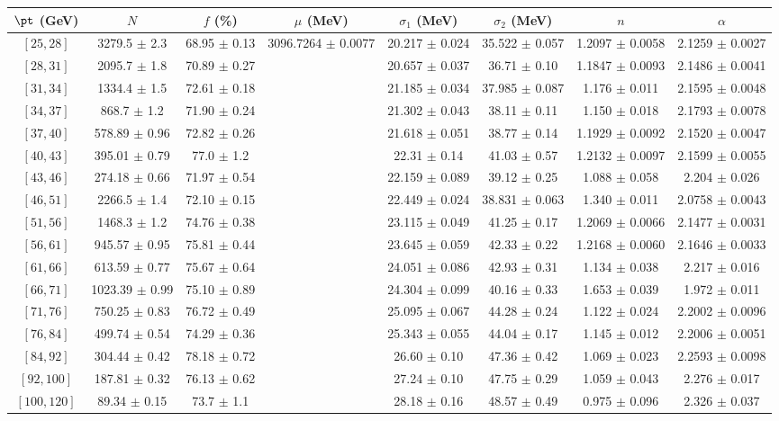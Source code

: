 \begin{tabular}{c||c|c|c|c|c|c|c}
$\pt$ (GeV) & $N$ & $f$ (\%) & $\mu$ (MeV) & $\sigma_1$ (MeV) & $\sigma_2$ (MeV) & $n$ & $\alpha$ \\
\hline
$[25, 28]$ & 3279.5 $\pm$ 2.3 & 68.95 $\pm$ 0.13 & \multirow{17}{*}{3096.7264 $\pm$ 0.0077} & 20.217 $\pm$ 0.024 & 35.522 $\pm$ 0.057 & 1.2097 $\pm$ 0.0058 & 2.1259 $\pm$ 0.0027\\
$[28, 31]$ & 2095.7 $\pm$ 1.8 & 70.89 $\pm$ 0.27 &  & 20.657 $\pm$ 0.037 & 36.71 $\pm$ 0.10 & 1.1847 $\pm$ 0.0093 & 2.1486 $\pm$ 0.0041\\
$[31, 34]$ & 1334.4 $\pm$ 1.5 & 72.61 $\pm$ 0.18 &  & 21.185 $\pm$ 0.034 & 37.985 $\pm$ 0.087 & 1.176 $\pm$ 0.011 & 2.1595 $\pm$ 0.0048\\
$[34, 37]$ & 868.7 $\pm$ 1.2 & 71.90 $\pm$ 0.24 &  & 21.302 $\pm$ 0.043 & 38.11 $\pm$ 0.11 & 1.150 $\pm$ 0.018 & 2.1793 $\pm$ 0.0078\\
$[37, 40]$ & 578.89 $\pm$ 0.96 & 72.82 $\pm$ 0.26 &  & 21.618 $\pm$ 0.051 & 38.77 $\pm$ 0.14 & 1.1929 $\pm$ 0.0092 & 2.1520 $\pm$ 0.0047\\
$[40, 43]$ & 395.01 $\pm$ 0.79 & 77.0 $\pm$ 1.2 &  & 22.31 $\pm$ 0.14 & 41.03 $\pm$ 0.57 & 1.2132 $\pm$ 0.0097 & 2.1599 $\pm$ 0.0055\\
$[43, 46]$ & 274.18 $\pm$ 0.66 & 71.97 $\pm$ 0.54 &  & 22.159 $\pm$ 0.089 & 39.12 $\pm$ 0.25 & 1.088 $\pm$ 0.058 & 2.204 $\pm$ 0.026\\
$[46, 51]$ & 2266.5 $\pm$ 1.4 & 72.10 $\pm$ 0.15 &  & 22.449 $\pm$ 0.024 & 38.831 $\pm$ 0.063 & 1.340 $\pm$ 0.011 & 2.0758 $\pm$ 0.0043\\
$[51, 56]$ & 1468.3 $\pm$ 1.2 & 74.76 $\pm$ 0.38 &  & 23.115 $\pm$ 0.049 & 41.25 $\pm$ 0.17 & 1.2069 $\pm$ 0.0066 & 2.1477 $\pm$ 0.0031\\
$[56, 61]$ & 945.57 $\pm$ 0.95 & 75.81 $\pm$ 0.44 &  & 23.645 $\pm$ 0.059 & 42.33 $\pm$ 0.22 & 1.2168 $\pm$ 0.0060 & 2.1646 $\pm$ 0.0033\\
$[61, 66]$ & 613.59 $\pm$ 0.77 & 75.67 $\pm$ 0.64 &  & 24.051 $\pm$ 0.086 & 42.93 $\pm$ 0.31 & 1.134 $\pm$ 0.038 & 2.217 $\pm$ 0.016\\
$[66, 71]$ & 1023.39 $\pm$ 0.99 & 75.10 $\pm$ 0.89 &  & 24.304 $\pm$ 0.099 & 40.16 $\pm$ 0.33 & 1.653 $\pm$ 0.039 & 1.972 $\pm$ 0.011\\
$[71, 76]$ & 750.25 $\pm$ 0.83 & 76.72 $\pm$ 0.49 &  & 25.095 $\pm$ 0.067 & 44.28 $\pm$ 0.24 & 1.122 $\pm$ 0.024 & 2.2002 $\pm$ 0.0096\\
$[76, 84]$ & 499.74 $\pm$ 0.54 & 74.29 $\pm$ 0.36 &  & 25.343 $\pm$ 0.055 & 44.04 $\pm$ 0.17 & 1.145 $\pm$ 0.012 & 2.2006 $\pm$ 0.0051\\
$[84, 92]$ & 304.44 $\pm$ 0.42 & 78.18 $\pm$ 0.72 &  & 26.60 $\pm$ 0.10 & 47.36 $\pm$ 0.42 & 1.069 $\pm$ 0.023 & 2.2593 $\pm$ 0.0098\\
$[92, 100]$ & 187.81 $\pm$ 0.32 & 76.13 $\pm$ 0.62 &  & 27.24 $\pm$ 0.10 & 47.75 $\pm$ 0.29 & 1.059 $\pm$ 0.043 & 2.276 $\pm$ 0.017\\
$[100, 120]$ & 89.34 $\pm$ 0.15 & 73.7 $\pm$ 1.1 &  & 28.18 $\pm$ 0.16 & 48.57 $\pm$ 0.49 & 0.975 $\pm$ 0.096 & 2.326 $\pm$ 0.037\\
\end{tabular}
